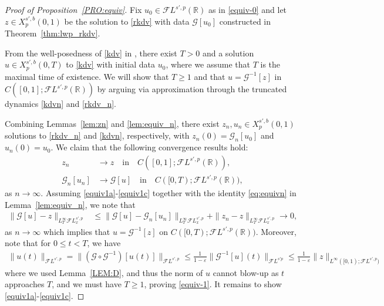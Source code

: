 \documentclass[a4paper,
11pt,  reqno]{amsart}
\newcommand{\5}{\textup{V}}
\newcommand{\FL}{\mathcal{F} L}
\newcommand{\eps}{\varepsilon}
\theoremstyle{remark}
\newcommand{\R}{\mathbb{R}}
\newcommand{\Gc}{\mathcal{G}}
\numberwithin{equation}{section}
\numberwithin{theorem}{section}
\begin{document}
\begin{proof}[Proof of Proposition~\ref{PRO:equiv}]

Fix $u_0 \in \FL^{s',p}(\R)$ as in \eqref{equiv-0} and let $z \in X^{s',b}_p(0,1)$ be the solution to \eqref{rkdv} with data $\Gc[u_0]$ constructed in Theorem~\ref{thm:lwp_rkdv}.


From the well-posedness of \eqref{kdv} in \cite{Grunrock_ldv_hier}, there exist $T>0$ and a solution $u \in X^{s',b}_p(0,T)$ to \eqref{kdv} with initial data $u_0$, where we assume that $T$ is the maximal time of existence.
We will show that $T\ge 1$ and that $u = \Gc^{-1} [z]$ in $C([0,1]; \FL^{s',p}(\R))$ by arguing via approximation through the truncated dynamics \eqref{kdvn} and \eqref{rkdv_n}.


Combining Lemmas~\ref{lem:zn} and \ref{lem:equiv_n}, there exist $z_n, u_n \in X^{s',b}_p(0,1)$ solutions to \eqref{rkdv_n} and \eqref{kdvn}, respectively, with $z_n (0) = \Gc_n[u_0] $ and $u_n(0) = u_0$.
We claim that the following convergence results hold:
\begin{align}
\label{equiv1a}
z_n & \to z \quad \text{in} \quad  C([0,1]; \FL^{s',p}(\R))
,
\\
\label{equiv1c}
\Gc_n [u_n] & \to  \Gc[u]   \quad \text{in} \quad  C([0,T); \FL^{s',p}(\R)),
\end{align}
as $n\to\infty$.
Assuming \eqref{equiv1a}-\eqref{equiv1c} together with the identity \eqref{eq:equivn} in Lemma~\ref{lem:equiv_n}, we note that
\begin{align}
\| \Gc[u] - z\|_{L^\infty_T \FL^{s',p}_x}
&
 \le
\| \Gc[u] - \Gc_n[u_n] \|_{L^\infty_T \FL^{s',p}_x}
+
\| z_n - z \|_{L^\infty_T \FL^{s',p}_x} \to 0,
\end{align}
as $n\to \infty$
which implies that
$u = \Gc^{-1}[z]$ on $C([0,T); \FL^{s',p}(\R))$.
Moreover, note that for $0\le t < T$, we have
\begin{align}
\| u (t) \|_{\FL^{s',p}}  = \|( \Gc \circ \Gc^{-1}) [u(t)] \|_{\FL^{s',p}} \le \tfrac{1}{1-\eps} \| \Gc^{-1}[u](t) \|_{\FL^{s'p}} \le \tfrac{1}{1-\eps} \|z\|_{L^\infty([0,1); \FL^{s',p})}
\end{align}
where we used Lemma~\ref{LEM:D}, and thus the norm of $u$ cannot blow-up as $t$ approaches $T$, and we must have $T \ge 1$, proving \eqref{equiv-1}.
%
It remains to show \eqref{equiv1a}-\eqref{equiv1c}.



\smallskip


\end{proof}
\end{document}
